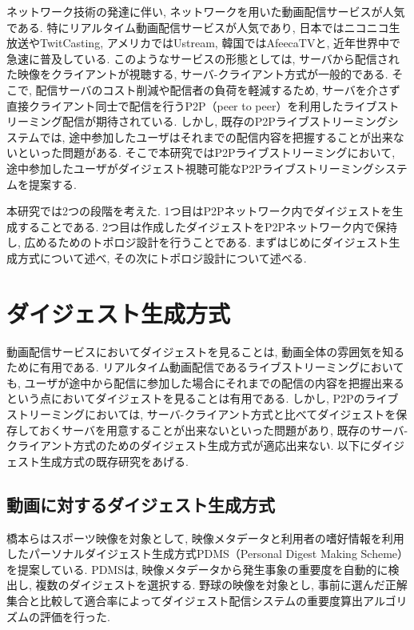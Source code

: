 ネットワーク技術の発達に伴い, ネットワークを用いた動画配信サービスが人気である. 特にリアルタイム動画配信サービスが人気であり, 日本ではニコニコ生放送\cite{nico}やTwitCasting\cite{twi}, アメリカではUstream\cite{ust}, 韓国ではAfeecaTV\cite{afr}と, 近年世界中で急速に普及している.  このようなサービスの形態としては, サーバから配信された映像をクライアントが視聴する, サーバ-クライアント方式が一般的である. そこで, 配信サーバのコスト削減や配信者の負荷を軽減するため, サーバを介さず直接クライアント同士で配信を行うP2P（peer to peer）を利用したライブストリーミング配信が期待されている. しかし, 既存のP2Pライブストリーミングシステムでは, 途中参加したユーザはそれまでの配信内容を把握することが出来ないといった問題がある. そこで本研究ではP2Pライブストリーミングにおいて, 途中参加したユーザがダイジェスト視聴可能なP2Pライブストリーミングシステムを提案する.

本研究では2つの段階を考えた. 1つ目はP2Pネットワーク内でダイジェストを生成することである. 2つ目は作成したダイジェストをP2Pネットワーク内で保持し, 広めるためのトポロジ設計を行うことである. まずはじめにダイジェスト生成方式について述べ, その次にトポロジ設計について述べる.

\newpage

\section{ダイジェスト生成方式}
動画配信サービスにおいてダイジェストを見ることは, 動画全体の雰囲気を知るために有用である. リアルタイム動画配信であるライブストリーミングにおいても, ユーザが途中から配信に参加した場合にそれまでの配信の内容を把握出来るという点においてダイジェストを見ることは有用である. しかし, P2Pのライブストリーミングにおいては, サーバ-クライアント方式と比べてダイジェストを保存しておくサーバを用意することが出来ないといった問題があり, 既存のサーバ-クライアント方式のためのダイジェスト生成方式が適応出来ない. 以下にダイジェスト生成方式の既存研究をあげる.

\subsection{動画に対するダイジェスト生成方式}
橋本らはスポーツ映像を対象として, 映像メタデータと利用者の嗜好情報を利用したパーソナルダイジェスト生成方式PDMS（Personal Digest Making Scheme）\cite{pdms}を提案している. PDMSは, 映像メタデータから発生事象の重要度を自動的に検出し, 複数のダイジェストを選択する. 野球の映像を対象とし, 事前に選んだ正解集合と比較して適合率によってダイジェスト配信システムの重要度算出アルゴリズムの評価を行った.

